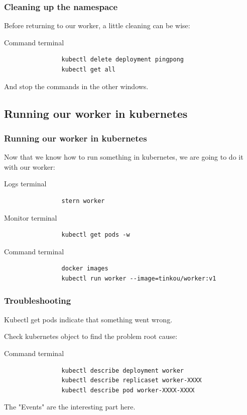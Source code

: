 	\begin{frame}[fragile]
		\frametitle{Cleaning up the namespace}
		
		Before returning to our worker, a little cleaning can be wise:
		\begin{block}{Command terminal}
			\begin{verbatim}
				kubectl delete deployment pingpong
				kubectl get all
			\end{verbatim}
		\end{block}
		
		\medskip
		
		And stop the commands in the other windows.
	\end{frame}
	
\subsection{Running our worker in kubernetes}

	\begin{frame}[fragile]
		\frametitle{Running our worker in kubernetes}
		
		Now that we know how to run something in kubernetes, we are going to do it with our worker:
		\begin{block}{Logs terminal}
			\begin{verbatim}
				stern worker
			\end{verbatim}
		\end{block}		
		\begin{block}{Monitor terminal}
			\begin{verbatim}
				kubectl get pods -w
			\end{verbatim}
		\end{block}
		\begin{block}{Command terminal}
			\begin{verbatim}
				docker images
				kubectl run worker --image=tinkou/worker:v1
			\end{verbatim}
		\end{block}
	\end{frame}
	
	\begin{frame}[fragile]
		\frametitle{Troubleshooting}
		
		Kubectl get pods indicate that something went wrong.
		
		Check kubernetes object to find the problem root cause:
		\begin{block}{Command terminal}
			\begin{verbatim}
				kubectl	describe deployment worker
				kubectl describe replicaset worker-XXXX
				kubectl describe pod worker-XXXX-XXXX
			\end{verbatim}
		\end{block}
		
		The "Events" are the interesting part here.
		
	\end{frame}
	
